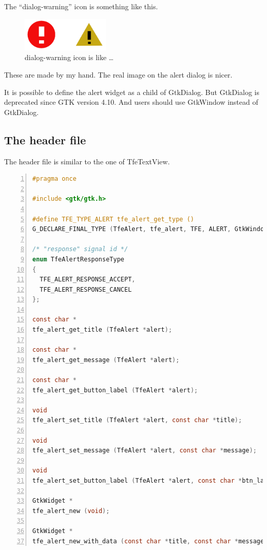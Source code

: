 The ``dialog-warning'' icon is something like this.

\begin{figure}
\centering
\includegraphics[width=4.19cm,height=1.62cm]{../image/dialog_warning.png}
\caption{dialog-warning icon is like \ldots{}}
\end{figure}

These are made by my hand. The real image on the alert dialog is nicer.

It is possible to define the alert widget as a child of GtkDialog. But
GtkDialog is deprecated since GTK version 4.10. And users should use
GtkWindow instead of GtkDialog.

\subsection{The header file}\label{the-header-file}

The header file is similar to the one of TfeTextView.

\begin{lstlisting}[language=C, numbers=left]
#pragma once

#include <gtk/gtk.h>

#define TFE_TYPE_ALERT tfe_alert_get_type ()
G_DECLARE_FINAL_TYPE (TfeAlert, tfe_alert, TFE, ALERT, GtkWindow)

/* "response" signal id */
enum TfeAlertResponseType
{
  TFE_ALERT_RESPONSE_ACCEPT,
  TFE_ALERT_RESPONSE_CANCEL
};

const char *
tfe_alert_get_title (TfeAlert *alert);

const char *
tfe_alert_get_message (TfeAlert *alert);

const char *
tfe_alert_get_button_label (TfeAlert *alert);

void
tfe_alert_set_title (TfeAlert *alert, const char *title);

void
tfe_alert_set_message (TfeAlert *alert, const char *message);

void
tfe_alert_set_button_label (TfeAlert *alert, const char *btn_label);

GtkWidget *
tfe_alert_new (void);

GtkWidget *
tfe_alert_new_with_data (const char *title, const char *message, const char* btn_label);
\end{lstlisting}

